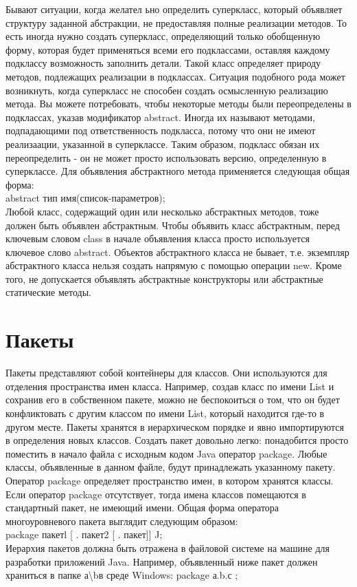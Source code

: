 \noindent Бывают ситуации, когда желател ьно определить суперкласс, который объявляет структуру заданной абстракции, не предоставляя полные реализации методов. То есть иногда нужно создать суперкласс, определяющий только обобщенную форму, которая будет применяться всеми его подклассами, оставляя каждому подклассу возможность заполнить детали. Такой класс определяет природу методов, подлежащих реализации в подклассах. Ситуация подобного рода может возникнуть, когда суперкласс не способен создать осмысленную реализацию метода. Вы можете потребовать, чтобы некоторые методы были переопределены в подклассах, указав модификатор abstract. Иногда их называют методами, подпадающими под ответственность подкласса, потому что они не имеют реализаации, указанной в суперклассе. Таким образом, подкласс обязан их переопределить - он не может просто использовать версию, определенную в суперклассе. Для объявления абстрактного метода применяется следующая общая форма: \\
abstract тип имя(список-параметров); \\
Любой класс, содержащий один или несколько абстрактных методов, тоже должен быть объявлен абстрактным. Чтобы объявить класс абстрактным, перед ключевым словом class в начале объявления класса просто используется ключевое слово abstract. Объектов абстрактного класса не бывает, т.е. экземпляр абстрактного класса нельзя создать напрямую с помощью операции new. Кроме того, не допускается объявлять абстрактные конструкторы или абстрактные статические методы.
\section{Пакеты}
Пакеты представляют собой контейнеры для классов. Они используются для отделения пространства имен класса. Например, создав класс по имени List и сохранив его в собственном пакете, можно не беспокоиться о том, что он будет конфликтовать с другим классом по имени List, который находится где-то в другом месте. Пакеты хранятся в иерархическом порядке и явно импортируются в определения новых классов. Создать пакет довольно легко: понадобится просто поместить в начало файла с исходным кодом Java оператор package. Любые классы, объявленные в данном файле, будут принадлежать указанному пакету. Оператор package определяет пространство имен, в котором хранятся классы. Если оператор package отсутствует, тогда имена классов помещаются в стандартный пакет, не имеющий имени. Общая форма оператора многоуровневого пакета выглядит следующим образом: \\
package пакетl [ . пакет2 [ . пакет]] J; \\
Иерархия пакетов должна быть отражена в файловой системе на машине для разработки приложений Java. Например, объявленный ниже пакет должен храниться в папке а\textbackslash b в среде Windows: package а.b.с ;

